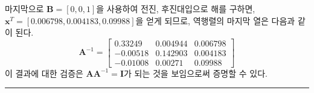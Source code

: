 마지막으로 $\mathbf{B}=[0,0,1]$을 사용하여 전진, 후진대입으로 해를 구하면, $\mathbf{x}^{T}=[0.006798,0.004183,0.09988]$을 얻게 되므로, 역행렬의 마지막 열은 다음과 같이 된다.
\begin{equation*}
\mathbf{A}^{-1}=\begin{bmatrix}0.33249&0.004944&0.006798\\-0.00518&0.142903&0.004183\\-0.01008&0.00271&0.09988\end{bmatrix}
\end{equation*}
이 결과에 대한 검증은 $\mathbf{AA}^{-1}=\mathbf{I}$가 되는 것을 보임으로써 증명할 수 있다.\\
\rule{\textwidth}{0.1pt}
%
